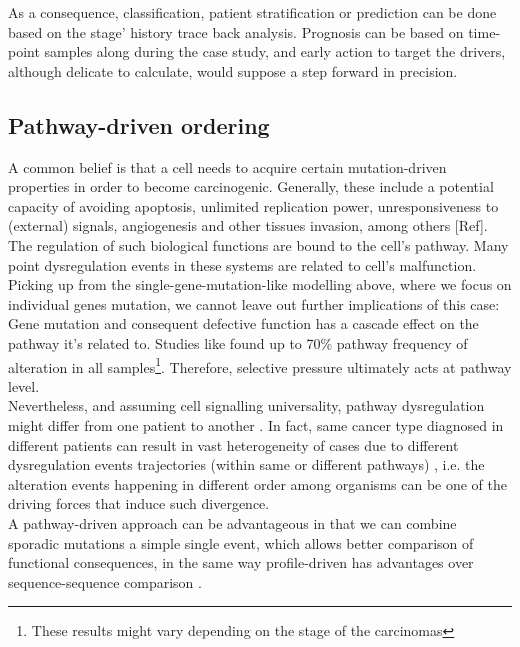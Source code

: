 As a consequence, classification, patient stratification or prediction can be done based on the stage’ history trace back analysis. Prognosis can be based on time-point samples \cite{Spencer2006ModelingTumorigenesis} along during the case study, and early action to target the drivers, although delicate to calculate, would suppose a step forward in precision. 
\\

\subsection{Pathway-driven ordering}
A common belief is that a cell needs to acquire certain mutation-driven properties in order to become carcinogenic. Generally, these include a potential capacity of avoiding apoptosis, unlimited replication power, unresponsiveness to (external) signals, angiogenesis and other tissues invasion, among others \cite{Hanahan2011HallmarksGeneration} [Ref]. The regulation of such biological functions are bound to the cell’s pathway. Many point dysregulation events in these systems are related to cell’s malfunction.
\\

Picking up from the single-gene-mutation-like modelling above, where we focus on individual genes mutation, we cannot leave out further implications of this case: Gene mutation and consequent defective function has a cascade effect on the pathway it's related to. Studies like \cite{Gerstung2011TheTumorigenesis} found up to 70\% pathway frequency of alteration in all samples\footnote{These results might vary depending on the stage of the carcinomas}. Therefore, selective pressure ultimately acts at pathway level.
\\

Nevertheless, and assuming cell signalling universality, pathway dysregulation might differ from one patient to another \cite{Ulitsky2010DEGAS:Diseases}. In fact, same cancer type diagnosed in different patients can result in vast heterogeneity of cases due to different dysregulation events trajectories (within same or different pathways) \cite{Khakabimamaghani2019UncoveringDysregulation}, i.e. the alteration events happening in different order among organisms can be one of the driving forces that induce such divergence.
\\

A pathway-driven approach can be advantageous in that we can combine sporadic mutations a simple single event, which allows better comparison of functional consequences, in the same way profile-driven has advantages over sequence-sequence comparison \cite{Cheng2012AGliomagenesis}.
\\

